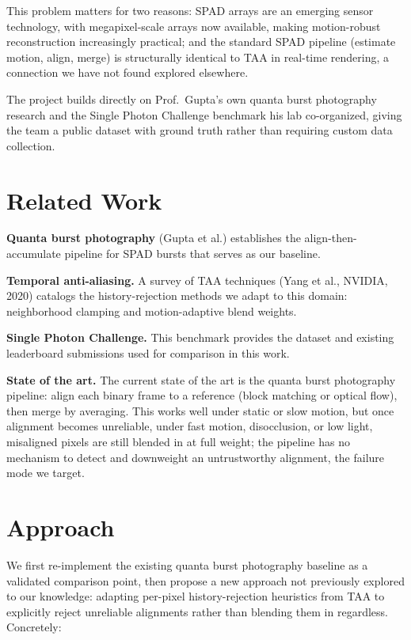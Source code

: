\documentclass[10pt,twocolumn]{article}
\begin{document}
This problem matters for two reasons: SPAD arrays are an emerging sensor technology, with megapixel-scale arrays now available, making motion-robust reconstruction increasingly practical; and the standard SPAD pipeline (estimate motion, align, merge) is structurally identical to TAA in real-time rendering, a connection we have not found explored elsewhere.

The project builds directly on Prof.\ Gupta's own quanta burst photography research and the Single Photon Challenge benchmark his lab co-organized, giving the team a public dataset with ground truth rather than requiring custom data collection.

\section{Related Work}

\textbf{Quanta burst photography} (Gupta et al.) establishes the align-then-accumulate pipeline for SPAD bursts that serves as our baseline.

\textbf{Temporal anti-aliasing.} A survey of TAA techniques (Yang et al., NVIDIA, 2020) catalogs the history-rejection methods we adapt to this domain: neighborhood clamping and motion-adaptive blend weights.

\textbf{Single Photon Challenge.} This benchmark provides the dataset and existing leaderboard submissions used for comparison in this work.

\textbf{State of the art.} The current state of the art is the quanta burst photography pipeline: align each binary frame to a reference (block matching or optical flow), then merge by averaging. This works well under static or slow motion, but once alignment becomes unreliable, under fast motion, disocclusion, or low light, misaligned pixels are still blended in at full weight; the pipeline has no mechanism to detect and downweight an untrustworthy alignment, the failure mode we target.

\section{Approach}

We first re-implement the existing quanta burst photography baseline as a validated comparison point, then propose a new approach not previously explored to our knowledge: adapting per-pixel history-rejection heuristics from TAA to explicitly reject unreliable alignments rather than blending them in regardless. Concretely:
\end{document}
